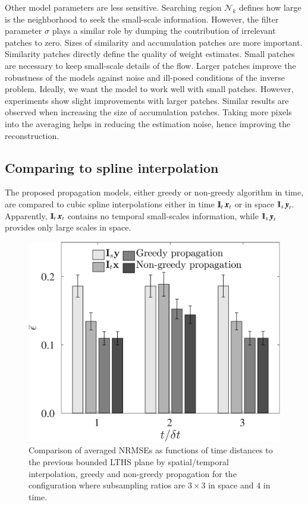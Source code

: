 Other model parameters are less sensitive. Searching region $ \mathcal{N}_k $ defines how large is the neighborhood to seek the small-scale information. However, the filter parameter $ \sigma $ plays a similar role by dumping the contribution of irrelevant patches to zero. Sizes of similarity and accumulation patches are more important. Similarity patches directly define the quality of weight estimates. Small patches are necessary to keep small-scale details of the flow. Larger patches improve the robustness of the models against noise and ill-posed conditions of the inverse problem. Ideally, we want the model to work well with small patches. However, experiments show slight improvements with larger patches. Similar results are observed when increasing the size of accumulation patches. Taking more pixels into the averaging helps in reducing the estimation noise, hence improving the reconstruction. 

\subsection{Comparing to spline interpolation}
The proposed propagation models, either greedy or non-greedy algorithm in time, are compared to cubic spline interpolations either in time $\Interp_t \mybold{x}_t $ or in space $\Interp_s \mybold{y}_t$. Apparently, $ \Interp_t \mybold{x}_t $ contains no temporal small-scales information, while $ \Interp_s \mybold{y}_t $ provides only large scales in space.

\begin{figure}
	\centering
	\includegraphics[width=.6\columnwidth]{./images/NLM/interpdiff/NLmean_interps_sspacing3_tspacing4_NRMSE.eps}
	\caption{\label{fig:NLmean_interps_sspacing3_tspacing4_NRMSE} Comparison of averaged NRMSEs as functions of time distances to the previous bounded LTHS plane by spatial/temporal interpolation, greedy and non-greedy propagation for the configuration where subsampling ratios are $ 3 \times 3 $ in space and $ 4 $ in time.}
\end{figure}

